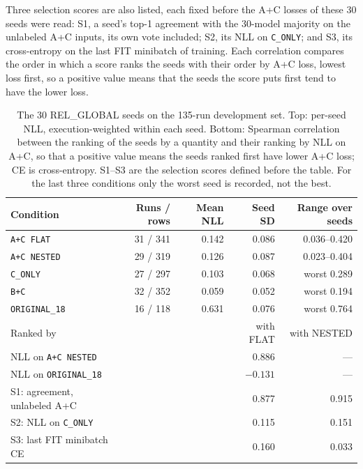 Three selection scores are also listed, each fixed before the A+C
losses of these 30 seeds were read: S1, a seed's top-1 agreement with
the 30-model majority on the unlabeled A+C inputs, its own vote
included; S2, its NLL on \texttt{C\_ONLY}; and S3, its cross-entropy on
the last FIT minibatch of training. Each correlation compares the order
in which a score ranks the seeds with their order by A+C loss, lowest
loss first, so a positive value means that the seeds the score puts
first tend to have the lower loss.

\begin{table}[htbp]
\centering
\caption[The 30 REL\_GLOBAL seeds on the 135-run development set]{The 30 REL\_GLOBAL seeds on the 135-run development set. Top:
per-seed NLL, execution-weighted within each seed. Bottom: Spearman
correlation between the ranking of the seeds by a quantity and their
ranking by NLL on A+C, so that a positive value means the seeds ranked
first have lower A+C loss; CE is cross-entropy. S1--S3 are the
selection scores defined before the table. For the last three
conditions only the worst seed is recorded, not the best.}
\label{tab:seed-population}
\small
\begin{tabular}{@{}lrrrr@{}}
\toprule
Condition & Runs / rows & Mean NLL & Seed SD & Range over seeds \\
\midrule
\texttt{A+C FLAT}     & 31 / 341 & 0.142 & 0.086 & 0.036--0.420 \\
\texttt{A+C NESTED}   & 29 / 319 & 0.126 & 0.087 & 0.023--0.404 \\
\texttt{C\_ONLY}      & 27 / 297 & 0.103 & 0.068 & worst 0.289 \\
\texttt{B+C}          & 32 / 352 & 0.059 & 0.052 & worst 0.194 \\
\texttt{ORIGINAL\_18} & 16 / 118 & 0.631 & 0.076 & worst 0.764 \\
\midrule
Ranked by & & & with FLAT & with NESTED \\
\midrule
NLL on \texttt{A+C NESTED}   & & & 0.886    & --- \\
NLL on \texttt{ORIGINAL\_18} & & & $-0.131$ & --- \\
S1: agreement, unlabeled A+C & & & 0.877 & 0.915 \\
S2: NLL on \texttt{C\_ONLY}  & & & 0.115 & 0.151 \\
S3: last FIT minibatch CE    & & & 0.160 & 0.033 \\
\bottomrule
\end{tabular}
\end{table}

